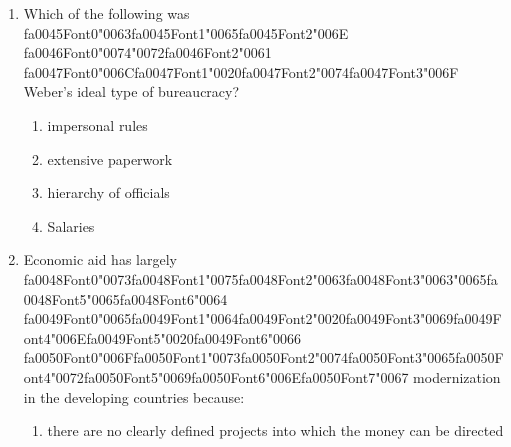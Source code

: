 \documentclass[12pt]{article}
\begin{document}
\begin{enumerate}[label=\arabic*.]
\begin{enumerate}[label=(\alph*)]
    \item they have a deep-rooted sense of ineffectiveness and are striving for control
    \item they are in pursuit of the 'perfect' body, fuelled by images of beauty
    \item they perceive a part of their body as stigmatizing, in relation to a cultural ideal
    \item their male partners pressurize them to look like supermodels
\end{enumerate}
\item Which of the following was {\csname fa0045Font0\endcsname\char"0063}{\csname fa0045Font1\endcsname\char"0065}{\csname fa0045Font2\endcsname\char"006E} {\csname fa0046Font0\endcsname\char"0074}{\char"0072}{\csname fa0046Font2\endcsname\char"0061} {\csname fa0047Font0\endcsname\char"006C}{\csname fa0047Font1\endcsname\char"0020}{\csname fa0047Font2\endcsname\char"0074}{\csname fa0047Font3\endcsname\char"006F} Weber's ideal type of bureaucracy?
\begin{enumerate}[label=(\alph*)]
    \item impersonal rules
    \item extensive paperwork
    \item hierarchy of officials
    \item Salaries
\end{enumerate}
\item Economic aid has largely {\csname fa0048Font0\endcsname\char"0073}{\csname fa0048Font1\endcsname\char"0075}{\csname fa0048Font2\endcsname\char"0063}{\csname fa0048Font3\endcsname\char"0063}{\char"0065}{\csname fa0048Font5\endcsname\char"0065}{\csname fa0048Font6\endcsname\char"0064} {\csname fa0049Font0\endcsname\char"0065}{\csname fa0049Font1\endcsname\char"0064}{\csname fa0049Font2\endcsname\char"0020}{\csname fa0049Font3\endcsname\char"0069}{\csname fa0049Font4\endcsname\char"006E}{\csname fa0049Font5\endcsname\char"0020}{\csname fa0049Font6\endcsname\char"0066} {\csname fa0050Font0\endcsname\char"006F}{\csname fa0050Font1\endcsname\char"0073}{\csname fa0050Font2\endcsname\char"0074}{\csname fa0050Font3\endcsname\char"0065}{\csname fa0050Font4\endcsname\char"0072}{\csname fa0050Font5\endcsname\char"0069}{\csname fa0050Font6\endcsname\char"006E}{\csname fa0050Font7\endcsname\char"0067} modernization in the developing countries because:
\begin{enumerate}[label=(\alph*)]
    \item there are no clearly defined projects into which the money can be directed

\end{enumerate}
\end{enumerate}
\end{document}
